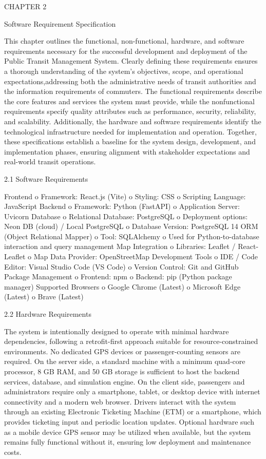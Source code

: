 CHAPTER 2

                          Software Requirement Specification

This chapter outlines the functional, non-functional, hardware, and software requirements necessary for the successful development and deployment of the Public Transit Management System. Clearly defining these requirements ensures a thorough understanding of the system’s objectives, scope, and operational expectations,addressing both the administrative needs of transit authorities and the information requirements of commuters.
The functional requirements describe the core features and services the system must provide, while the nonfunctional requirements specify quality attributes such as performance, security, reliability, and scalability.
Additionally, the hardware and software requirements identify the technological infrastructure needed for
implementation and operation. Together, these specifications establish a baseline for the system design,
development, and implementation phases, ensuring alignment with stakeholder expectations and real-world transit operations.


2.1 Software Requirements 

Frontend
o	Framework: React.js (Vite)
o	Styling: CSS
o	Scripting Language: JavaScript
Backend
o	Framework: Python (FastAPI)
o	Application Server: Uvicorn
Database
o	Relational Database: PostgreSQL
o	Deployment options: Neon DB (cloud) / Local PostgreSQL
o	Database Version: PostgreSQL 14
ORM (Object Relational Mapper)
o	Tool: SQLAlchemy
o	Used for Python-to-database interaction and query management
Map Integration
o	Libraries: Leaflet / React-Leaflet
o	Map Data Provider: OpenStreetMap
Development Tools
o	IDE / Code Editor: Visual Studio Code (VS Code)
o	Version Control: Git and GitHub
Package Management
o	Frontend: npm
o	Backend: pip (Python package manager)
Supported Browsers
o	Google Chrome (Latest)
o	Microsoft Edge (Latest)
o	Brave (Latest)



2.2 Hardware Requirements

The system is intentionally designed to operate with minimal hardware dependencies, following a retrofit-first approach suitable for resource-constrained environments. No dedicated GPS devices or passenger-counting sensors are required. On the server side, a standard machine with a minimum quad-core processor, 8 GB RAM, and 50 GB storage is sufficient to host the backend services, database, and simulation engine. On the client side, passengers and administrators require only a smartphone, tablet, or desktop device with internet connectivity and a modern web browser. Drivers interact with the system through an existing Electronic Ticketing Machine (ETM) or a smartphone, which provides ticketing input and periodic location updates. Optional hardware such as a mobile device GPS sensor may be utilized when available, but the system remains fully functional without it, ensuring low deployment and maintenance costs.


